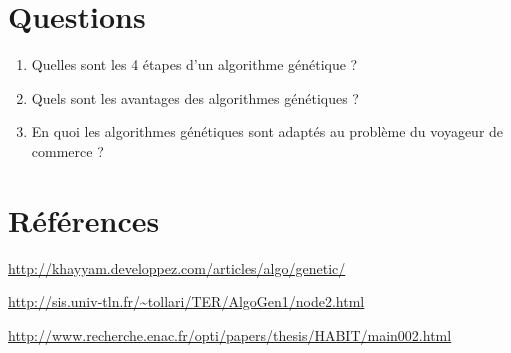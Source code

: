 \documentclass{article}
\begin{document}
\section{Questions}

\begin{enumerate}
\item Quelles sont les 4 étapes d'un algorithme génétique ?
\item Quels sont les avantages des algorithmes génétiques ?
\item En quoi les algorithmes génétiques sont adaptés au problème du voyageur de commerce ?
\end{enumerate}

\section{Références}
	\url{http://khayyam.developpez.com/articles/algo/genetic/}

	\url{http://sis.univ-tln.fr/~tollari/TER/AlgoGen1/node2.html}

	\url{http://www.recherche.enac.fr/opti/papers/thesis/HABIT/main002.html}
\end{document}
